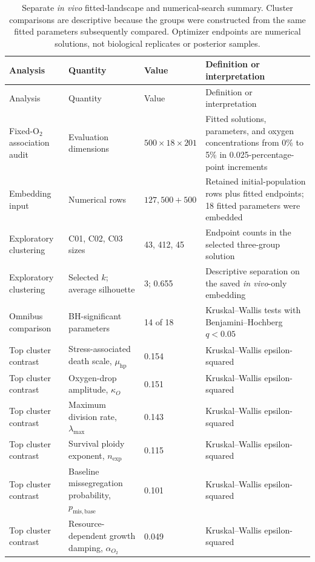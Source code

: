 \begingroup
\scriptsize
\setlength{\tabcolsep}{3.2pt}
\begin{longtable}{@{}p{}p{}p{}p{}@{}}
\caption{Separate \textit{in vivo} fitted-landscape and numerical-search summary. Cluster comparisons are descriptive because the groups were constructed from the same fitted parameters subsequently compared. Optimizer endpoints are numerical solutions, not biological replicates or posterior samples.}\label{tab:invivo_landscape_optimizer_summary}\\
\toprule
Analysis & Quantity & Value & Definition or interpretation \\
\midrule
\endfirsthead
\toprule
Analysis & Quantity & Value & Definition or interpretation \\
\midrule
\endhead
Fixed-O$_2$ association audit & Evaluation dimensions & $500\times18\times201$ & Fitted solutions, parameters, and oxygen concentrations from 0\% to 5\% in 0.025-percentage-point increments \\
Embedding input & Numerical rows & $127{,}500+500$ & Retained initial-population rows plus fitted endpoints; 18 fitted parameters were embedded \\
Exploratory clustering & C01, C02, C03 sizes & 43, 412, 45 & Endpoint counts in the selected three-group solution \\
Exploratory clustering & Selected $k$; average silhouette & 3; 0.655 & Descriptive separation on the saved \textit{in vivo}-only embedding \\
Omnibus comparison & BH-significant parameters & 14 of 18 & Kruskal--Wallis tests with Benjamini--Hochberg $q<0.05$ \\
\midrule
Top cluster contrast & Stress-associated death scale, $\mu_{\mathrm{hp}}$ & 0.154 & Kruskal--Wallis epsilon-squared \\
Top cluster contrast & Oxygen-drop amplitude, $\kappa_O$ & 0.151 & Kruskal--Wallis epsilon-squared \\
Top cluster contrast & Maximum division rate, $\lambda_{\max}$ & 0.143 & Kruskal--Wallis epsilon-squared \\
Top cluster contrast & Survival ploidy exponent, $n_{\mathrm{exp}}$ & 0.115 & Kruskal--Wallis epsilon-squared \\
Top cluster contrast & Baseline missegregation probability, $p_{\mathrm{mis,base}}$ & 0.101 & Kruskal--Wallis epsilon-squared \\
Top cluster contrast & Resource-dependent growth damping, $\alpha_{O_2}$ & 0.049 & Kruskal--Wallis epsilon-squared \\

\end{longtable}
